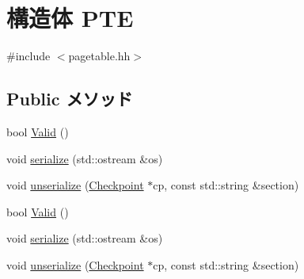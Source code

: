 \hypertarget{structMipsISA_1_1PTE}{
\section{構造体 PTE}
\label{structMipsISA_1_1PTE}
}


{\ttfamily \#include $<$pagetable.hh$>$}\subsection*{Public メソッド}
\begin{DoxyCompactItemize}
\item 
bool \hyperlink{structMipsISA_1_1PTE_a62f0e274c1fe43a9411e2c6d3d144913}{Valid} ()
\item 
void \hyperlink{structMipsISA_1_1PTE_a53e036786d17361be4c7320d39c99b84}{serialize} (std::ostream \&os)
\item 
void \hyperlink{structMipsISA_1_1PTE_af22e5d6d660b97db37003ac61ac4ee49}{unserialize} (\hyperlink{classCheckpoint}{Checkpoint} $\ast$cp, const std::string \&section)
\item 
bool \hyperlink{structMipsISA_1_1PTE_a62f0e274c1fe43a9411e2c6d3d144913}{Valid} ()
\item 
void \hyperlink{structMipsISA_1_1PTE_a53e036786d17361be4c7320d39c99b84}{serialize} (std::ostream \&os)
\item 
void \hyperlink{structMipsISA_1_1PTE_af22e5d6d660b97db37003ac61ac4ee49}{unserialize} (\hyperlink{classCheckpoint}{Checkpoint} $\ast$cp, const std::string \&section)
\end{DoxyCompactItemize}
